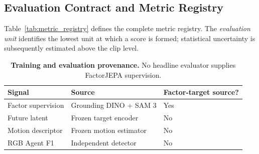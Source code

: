 \subsection{Evaluation Contract and Metric Registry}
\label{app:metric_registry}

Table~\ref{tab:metric_registry} defines the complete metric registry.
The \emph{evaluation unit} identifies the lowest unit at which a score
is formed; statistical uncertainty is subsequently estimated above the
clip level.

\begin{table}[t]
\centering
\caption{
\textbf{Training and evaluation provenance.}
No headline evaluator supplies FactorJEPA supervision.
}
\label{tab:evaluator_provenance}
\small
\setlength{\tabcolsep}{6pt}
\renewcommand{\arraystretch}{1.1}
\begin{tabular}{lll}
\toprule
\textbf{Signal} & \textbf{Source} & \textbf{Factor-target source?} \\
\midrule
Factor supervision       & Grounding DINO + SAM 3    & Yes \\
Future latent            & Frozen target encoder    & No \\
Motion descriptor        & Frozen motion estimator  & No \\
RGB Agent F1             & Independent detector     & No \\
\bottomrule
\end{tabular}
\end{table}

